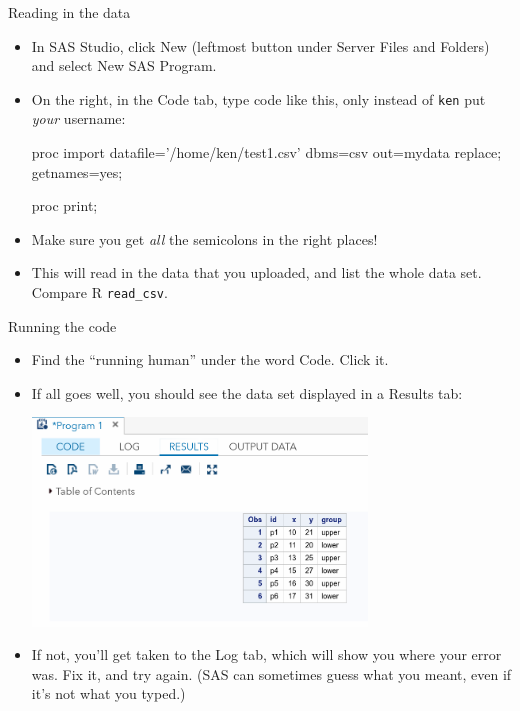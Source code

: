 \documentclass[unknownkeysallowed]{beamer}\usepackage[]{graphicx}\usepackage[]{color}
\begin{document}
\begin{frame}[fragile]{Reading in the data}
  
  \begin{itemize}
  \item In SAS Studio, click New (leftmost button under Server Files
    and Folders) and select New SAS Program.
  \item On the right, in the Code tab, type code like this, only
    instead of \texttt{ken} put \emph{your} username:
    
\begin{Datastep}
proc import 
  datafile='/home/ken/test1.csv'
  dbms=csv
  out=mydata
  replace;
  getnames=yes;
\end{Datastep}
    
\begin{Sascode}[store=ra]
proc print;
\end{Sascode}
  \item Make sure you get \emph{all} the semicolons in the right
    places!
  \item This will read in the data that you uploaded, and list the
    whole data set. Compare R \texttt{read\_csv}.
  \end{itemize}
  
\end{frame}


\begin{frame}[fragile]{Running the code}
  
  \begin{itemize}
  \item Find the ``running human'' under the word Code. Click it. 
  \item If all goes well, you should see the data set displayed in a
    Results tab:
    
\includegraphics[width=0.7\textwidth]{sasstudio-results}

\item If not, you'll get taken to the Log tab, which will show you
  where your error was. Fix it, and try again. (SAS can sometimes
  guess what you meant, even if it's not what you typed.)
  \end{itemize}
  
\end{frame}
\end{document}
